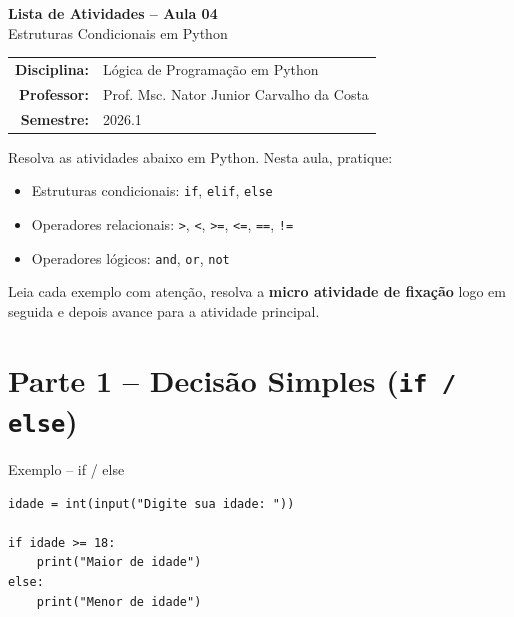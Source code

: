 \documentclass[12pt]{article}
\begin{document}
\begin{center}
\colorbox{primary}{\parbox{\dimexpr\linewidth-2\fboxsep\relax}{%
\centering\color{white}
\vspace{6pt}
{\LARGE \textbf{Lista de Atividades -- Aula 04}}\\[4pt]
{\large Estruturas Condicionais em Python}\\[6pt]
}}
\vspace{8pt}

\begin{tabular}{rl}
\textbf{Disciplina:} & Lógica de Programação em Python\\
\textbf{Professor:} & Prof. Msc. Nator Junior Carvalho da Costa\\
\textbf{Semestre:} & 2026.1\\
\end{tabular}
\end{center}

\vspace{6pt}

\begin{instrucaobox}
Resolva as atividades abaixo em Python. Nesta aula, pratique:
\begin{itemize}
    \item Estruturas condicionais: \texttt{if}, \texttt{elif}, \texttt{else}
    \item Operadores relacionais: \texttt{>}, \texttt{<}, \texttt{>=}, \texttt{<=}, \texttt{==}, \texttt{!=}
    \item Operadores lógicos: \texttt{and}, \texttt{or}, \texttt{not}
\end{itemize}
Leia cada exemplo com atenção, resolva a \textbf{micro atividade de fixação} logo em seguida e depois avance para a atividade principal.
\end{instrucaobox}

\section*{Parte 1 -- Decisão Simples (\texttt{if / else})}

\begin{exemplobox}{Exemplo -- if / else}
\begin{lstlisting}
idade = int(input("Digite sua idade: "))

if idade >= 18:
    print("Maior de idade")
else:
    print("Menor de idade")
\end{lstlisting}
\end{exemplobox}
\end{document}
